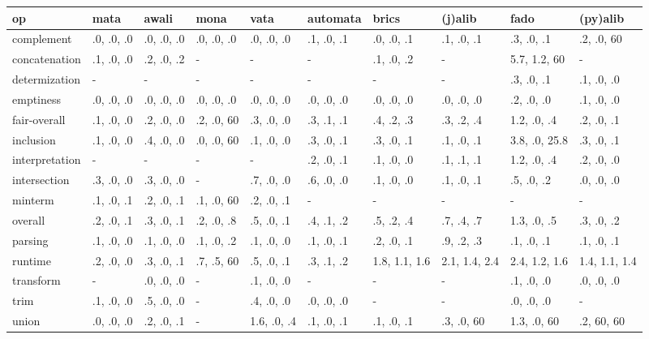 \begin{tabular}{llllllllll}
\hline
 op             & mata       & awali      & mona       & vata        & automata   & brics         & (j)alib       & fado          & (py)alib      \\
\hline
 complement     & .0, .0, .0 & .0, .0, .0 & .0, .0, .0 & .0, .0, .0  & .1, .0, .1 & .0, .0, .1    & .1, .0, .1    & .3, .0, .1    & .2, .0, 60    \\
 concatenation  & .1, .0, .0 & .2, .0, .2 & -          & -           & -          & .1, .0, .2    & -             & 5.7, 1.2, 60  & -             \\
 determization  & -          & -          & -          & -           & -          & -             & -             & .3, .0, .1    & .1, .0, .0    \\
 emptiness      & .0, .0, .0 & .0, .0, .0 & .0, .0, .0 & .0, .0, .0  & .0, .0, .0 & .0, .0, .0    & .0, .0, .0    & .2, .0, .0    & .1, .0, .0    \\
 fair-overall   & .1, .0, .0 & .2, .0, .0 & .2, .0, 60 & .3, .0, .0  & .3, .1, .1 & .4, .2, .3    & .3, .2, .4    & 1.2, .0, .4   & .2, .0, .1    \\
 inclusion      & .1, .0, .0 & .4, .0, .0 & .0, .0, 60 & .1, .0, .0  & .3, .0, .1 & .3, .0, .1    & .1, .0, .1    & 3.8, .0, 25.8 & .3, .0, .1    \\
 interpretation & -          & -          & -          & -           & .2, .0, .1 & .1, .0, .0    & .1, .1, .1    & 1.2, .0, .4   & .2, .0, .0    \\
 intersection   & .3, .0, .0 & .3, .0, .0 & -          & .7, .0, .0  & .6, .0, .0 & .1, .0, .0    & .1, .0, .1    & .5, .0, .2    & .0, .0, .0    \\
 minterm        & .1, .0, .1 & .2, .0, .1 & .1, .0, 60 & .2, .0, .1  & -          & -             & -             & -             & -             \\
 overall        & .2, .0, .1 & .3, .0, .1 & .2, .0, .8 & .5, .0, .1  & .4, .1, .2 & .5, .2, .4    & .7, .4, .7    & 1.3, .0, .5   & .3, .0, .2    \\
 parsing        & .1, .0, .0 & .1, .0, .0 & .1, .0, .2 & .1, .0, .0  & .1, .0, .1 & .2, .0, .1    & .9, .2, .3    & .1, .0, .1    & .1, .0, .1    \\
 runtime        & .2, .0, .0 & .3, .0, .1 & .7, .5, 60 & .5, .0, .1  & .3, .1, .2 & 1.8, 1.1, 1.6 & 2.1, 1.4, 2.4 & 2.4, 1.2, 1.6 & 1.4, 1.1, 1.4 \\
 transform      & -          & .0, .0, .0 & -          & .1, .0, .0  & -          & -             & -             & .1, .0, .0    & .0, .0, .0    \\
 trim           & .1, .0, .0 & .5, .0, .0 & -          & .4, .0, .0  & .0, .0, .0 & -             & -             & .0, .0, .0    & -             \\
 union          & .0, .0, .0 & .2, .0, .1 & -          & 1.6, .0, .4 & .1, .0, .1 & .1, .0, .1    & .3, .0, 60    & 1.3, .0, 60   & .2, 60, 60    \\
\hline
\end{tabular}